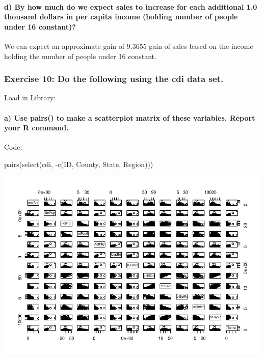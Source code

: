 \documentclass[
]{article}
\newenvironment{Shaded}{\begin{snugshade}}{\end{snugshade}}
\newcommand{\FunctionTok}[1]{\textcolor[rgb]{0.00,0.00,0.00}{#1}}
\newcommand{\NormalTok}[1]{#1}
\newcommand{\SpecialCharTok}[1]{\textcolor[rgb]{0.00,0.00,0.00}{#1}}
\begin{document}
\hypertarget{d-by-how-much-do-we-expect-sales-to-increase-for-each-additional-1.0-thousand-dollars-in-per-capita-income-holding-number-of-people-under-16-constant}{%
\paragraph{d) By how much do we expect sales to increase for each
additional 1.0 thousand dollars in per capita income (holding number of
people under 16
constant)?}\label{d-by-how-much-do-we-expect-sales-to-increase-for-each-additional-1.0-thousand-dollars-in-per-capita-income-holding-number-of-people-under-16-constant}}

\hfill\break
We can expect an approximate gain of 9.3655 gain of sales based on the
income holding the number of people under 16 constant. \newpage

\hypertarget{exercise-10-do-the-following-using-the-cdi-data-set.}{%
\subsubsection{Exercise 10: Do the following using the cdi data
set.}\label{exercise-10-do-the-following-using-the-cdi-data-set.}}

Load in Library:

\hypertarget{a-use-pairs-to-make-a-scatterplot-matrix-of-these-variables.-report-your-r-command.}{%
\paragraph{a) Use pairs() to make a scatterplot matrix of these
variables. Report your R
command.}\label{a-use-pairs-to-make-a-scatterplot-matrix-of-these-variables.-report-your-r-command.}}

\hfill\break
Code:

\begin{Shaded}
\begin{Highlighting}[]
\FunctionTok{pairs}\NormalTok{(}\FunctionTok{select}\NormalTok{(cdi, }\SpecialCharTok{{-}}\FunctionTok{c}\NormalTok{(ID, County, State, Region)))}
\end{Highlighting}
\end{Shaded}

\includegraphics{Class_Exercises_ClassNotes_5_files/figure-latex/unnamed-chunk-39-1.pdf}
\newpage
\end{document}
